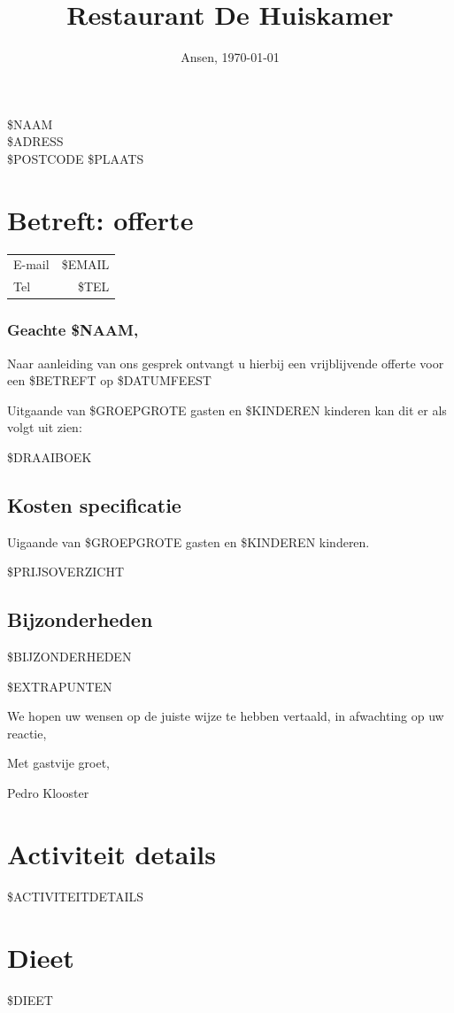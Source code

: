\documentclass{scrartcl}
\begin{document}

\title{Restaurant De Huiskamer}
\date{Ansen, \today}
\maketitle
\thispagestyle{footer}

\begin{flushright}
	\$NAAM \\
	\$ADRESS \\
	\$POSTCODE \$PLAATS
\end{flushright}
\section*{Betreft: offerte}
\begin{tabular}{l r}
  E-mail & \$EMAIL  \\
  Tel & \$TEL  \\
\end{tabular}

\subsubsection*{Geachte \$NAAM,}

Naar aanleiding van ons gesprek ontvangt u hierbij een vrijblijvende offerte
voor een \$BETREFT op \$DATUMFEEST

Uitgaande van \$GROEPGROTE gasten en \$KINDEREN kinderen kan dit er als volgt uit zien:

\$DRAAIBOEK

\newpage

\subsection*{Kosten specificatie}
Uigaande van \$GROEPGROTE gasten en \$KINDEREN kinderen.

\$PRIJSOVERZICHT

\subsection*{Bijzonderheden}

\$BIJZONDERHEDEN

\$EXTRAPUNTEN

We hopen uw wensen op de juiste wijze te hebben vertaald, in afwachting op uw reactie,

Met gastvije groet,

Pedro Klooster

\newpage

\section*{Activiteit details}

\$ACTIVITEITDETAILS

\section*{Dieet}

\$DIEET
\end{document}
